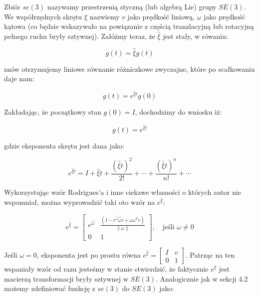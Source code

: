 \documentclass[a4paper,12pt]{article}
\begin{document}
Zbiór $se(3)$ nazywamy przestrzenią styczną (lub algebrą Lie) grupy $SE(3)$. We współrzędnych skrętu $\xi$ nazwiemy $v$ jako prędkość liniową, $\omega$ jako prędkość kątowa (co będzie wskazywało na powiązanie z częścią tranzlacyjną lub rotacyjną pełnego ruchu bryły sztywnej). Załóżmy teraz, że $\hat{\xi}$ jest stały, w rówaniu:

\begin{equation}
\dot{g}(t) = \hat{\xi}g(t)
\end{equation}

\noindent znów otrzymujemy liniowe równanie różniczkowe zwyczajne, które po scałkowaniu daje nam:

\begin{equation}
g(t)=e^{\hat{\xi}t}g(0)
\end{equation}

\noindent Zakładając, że początkowy stan $g(0)=I$, dochodzimy do wniosku iż:

\begin{equation}
g(t) = e^{\hat{\xi}t}
\end{equation}

\noindent gdzie eksponenta skrętu jest dana jako:

\begin{equation}
e^{\hat{\xi}t} = I + \hat{\xi}t + \frac{(\hat{\xi}t)^2}{2!} + \cdots + \frac{(\hat{\xi}t)^n}{n!} + \cdots
\end{equation}

Wykorzystując wzór Rodrigues'a i inne ciekawe własności o których autor nie wspomniał, można wyprowadzić taki oto wzór na $e^{\hat{\xi}}$:

\begin{equation}
e^{\hat{\xi}}=\begin{bmatrix} e^{\hat{\omega}} & \frac{(I-e^{\hat{\omega}}\hat{\omega}v+\omega\omega^Tv)}{\| \omega \|} \\ 0 & 1 \end{bmatrix}, \quad \text{jeśli } \omega \neq 0
\end{equation}

\noindent Jeśli $\omega=0$, eksponenta jest po prostu równa $e^{\hat{\xi}}=\begin{bmatrix} I & v \\ 0 & 1 \end{bmatrix}$. Patrząc na ten wspaniały wzór od razu jesteśmy w stanie stwierdzić, że faktycznie $e^{\xi}$ jest macierzą transformacji bryły sztywnej w $SE(3)$. Analogicznie jak w sekcji 4.2 możemy zdefiniować funkcję z $se(3)$ do $SE(3)$ jako:
\end{document}
